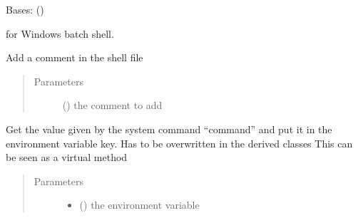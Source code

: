 \documentclass[a4paper,10pt,english]{sphinxmanual}
\begin{document}
\begin{fulllineitems}
\label{\detokenize{commands/apidoc/src:src.fileEnviron.BatFileEnviron}}
Bases: {\hyperref[\detokenize{commands/apidoc/src:src.fileEnviron.FileEnviron}]{}} ()

for Windows batch shell.

\begin{fulllineitems}
\label{\detokenize{commands/apidoc/src:src.fileEnviron.BatFileEnviron.add_comment}}
Add a comment in the shell file
\begin{quote}\begin{description}
\item[{Parameters}] \leavevmode
{} () \textendash{} the comment to add

\end{description}\end{quote}

\end{fulllineitems}


\begin{fulllineitems}
\label{\detokenize{commands/apidoc/src:src.fileEnviron.BatFileEnviron.command_value}}
Get the value given by the system command “command” 
and put it in the environment variable key.
Has to be overwritten in the derived classes
This can be seen as a virtual method
\begin{quote}\begin{description}
\item[{Parameters}] \leavevmode\begin{itemize}
\item {} 
 () \textendash{} the environment variable


\end{itemize}
\end{description}
\end{quote}
\end{fulllineitems}
\end{fulllineitems}
\end{document}
